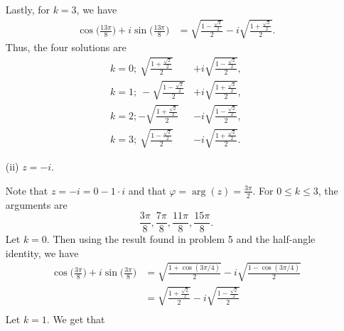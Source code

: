 \documentclass[a4paper]{article}
\begin{document}
\begin{enumerate}
\begin{solution}
        Lastly, for \( k =3  \), we have 
        \begin{align*}
            \cos \Big(  \frac{  13 \pi  }{ 8 }   \Big) + i \sin \Big(  \frac{ 13 \pi  }{ 8 }  \Big) &= \sqrt{ \frac{ 1 - \frac{ \sqrt{ 2 }  }{ 2 }  }{ 2 }  }  - i \sqrt{ \frac{ 1 + \frac{ \sqrt{ 2 }  }{ 2 }  }{ 2 }  }.
        \end{align*}
        Thus, the four solutions are
        \begin{align*}
            k = 0;  \ \sqrt{ \frac{ 1 + \frac{ \sqrt{ 2 }  }{ 2 }  }{ 2 }  }  &+ i \sqrt{ \frac{ 1 - \frac{ \sqrt{ 2 }  }{ 2 }  }{ 2 }   },  \\
           k = 1; \  -\sqrt{ \frac{ 1 - \frac{ \sqrt{ 2 }  }{ 2 }  }{ 2 }  }  &+ i \sqrt{ \frac{ 1 + \frac{ \sqrt{ 2 }  }{ 2 }  }{ 2 }  }, \\ 
           k= 2;  -\sqrt{ \frac{ 1 + \frac{ \sqrt{ 2 }  }{ 2 }  }{ 2 }  }  &- i \sqrt{ \frac{ 1 - \frac{ \sqrt{ 2 }  }{ 2 }  }{ 2 }  }, \\
           k=3; \ \sqrt{ \frac{ 1 - \frac{ \sqrt{ 2 }  }{ 2 }  }{ 2 }   }  &- i \sqrt{ \frac{ 1 + \frac{ \sqrt{ 2 }  }{ 2 }  }{ 2 }  }.
        \end{align*}
                \end{solution}
            \item[(ii)] \( z = -i \).
                \begin{solution}
                Note that \( z = - i = 0 - 1 \cdot i  \) and that \( \varphi = \arg(z) = \frac{ 3 \pi  }{ 2 }     \). For \( 0 \leq k \leq 3  \), the arguments are
                \[  \frac{ 3 \pi  }{ 8  }, \frac{ 7 \pi   }{ 8  }, \frac{ 11 \pi  }{ 8 }, \frac{ 15 \pi  }{ 8 }.  \]
                Let \( k = 0  \). Then using the result found in problem 5 and the half-angle identity, we have
                \begin{align*}
                    \cos \Big(  \frac{ 3 \pi  }{ 8  }  \Big) + i \sin \Big(  \frac{ 3 \pi  }{ 8  }  \Big) &=  \sqrt{ \frac{ 1 + \cos(3 \pi /4) }{ 2 }  }  - i \sqrt{ \frac{ 1 - \cos (3 \pi /4 ) }{ 2 }  }    \\
                                                                                                          &=  \sqrt{ \frac{ 1 + \frac{ \sqrt{ 2 }  }{ 2 }  }{ 2 }  }  - i \sqrt{ \frac{ 1 -  \frac{ \sqrt{ 2 }  }{ 2 } }{ 2 }  }    \\ 
                \end{align*}
                Let \( k = 1  \). We get that  
                \begin{align*}

\end{align*}
\end{solution}
\end{enumerate}
\end{document}
